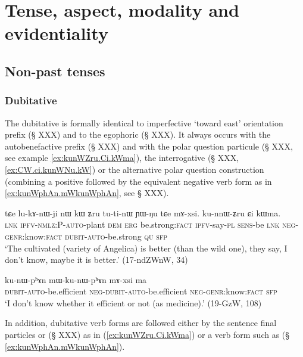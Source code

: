  \chapter{Tense, aspect, modality and evidentiality} \label{chap:tame}

  \section{Non-past tenses}
 \subsection{Dubitative}
 The dubitative  is formally identical to imperfective `toward east' orientation prefix (§ XXX) and to the egophoric (§ XXX). It always occurs with the autobenefactive  prefix (§ XXX) and with the polar question  particule (§ XXX, see example \ref{ex:kunWZru.Ci.kWma}), the interrogative  (§ XXX, \ref{ex:CW.ci.kunWNu.kW}) or the alternative polar question construction (combining a positive followed by the equivalent negative verb form as in \ref{ex:kunWphAn.mWkunWphAn}, see § XXX).
 
 \begin{exe}
\ex \label{ex:kunWZru.Ci.kWma}
 \gll  tɕe lu-kɤ-nɯ-ji nɯ kɯ ʑru tu-ti-nɯ ɲɯ-ŋu tɕe mɤ-xsi. ku-nnɯ-ʑru ɕi kɯma. \\
 \textsc{lnk} \textsc{ipfv}-\textsc{nmlz}:P-\textsc{auto}-plant \textsc{dem} \textsc{erg} be.strong:\textsc{fact} \textsc{ipfv}-say-\textsc{pl} \textsc{sens}-be \textsc{lnk} \textsc{neg}-\textsc{genr}:know:\textsc{fact}  \textsc{dubit}-\textsc{auto}-be.strong \textsc{qu} \textsc{sfp} \\
 \glt `The cultivated (variety of Angelica) is better (than the wild one), they say, I don't know, maybe it is better.' (17-ndZWnW, 34)
 \end{exe}
 

  \begin{exe}
\ex \label{ex:kunWphAn.mWkunWphAn}
 \gll  ku-nɯ-pʰɤn mɯ-ku-nɯ-pʰɤn mɤ-xsi ma \\
 \textsc{dubit}-\textsc{auto}-be.efficient \textsc{neg}-\textsc{dubit}-\textsc{auto}-be.efficient \textsc{neg}-\textsc{genr}:know:\textsc{fact} \textsc{sfp} \\
\glt `I don't know whether it efficient or not (as medicine).' (19-GzW, 108)
  \end{exe}

In addition, dubitative verb forms are followed either by the sentence final particles  or  (§ XXX) as in (\ref{ex:kunWZru.Ci.kWma}) or a verb form such as  (§ \ref{ex:kunWphAn.mWkunWphAn}).

